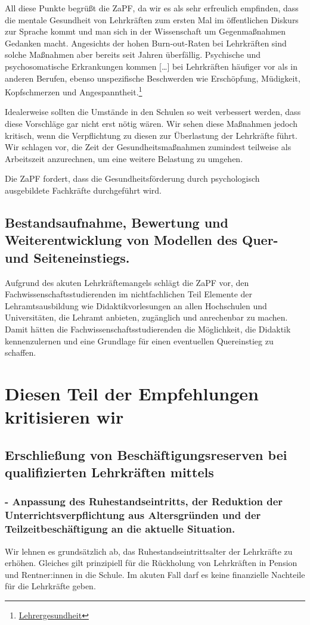 \documentclass[DIV=calc]{scrartcl}
\let\oldgrqq=\grqq
\def\grqq{\oldgrqq\xspace}
\begin{document}
All diese Punkte begrüßt die ZaPF, da wir es als sehr erfreulich empfinden, dass die mentale Gesundheit von Lehrkräften zum ersten Mal im öffentlichen Diskurs zur Sprache kommt und man sich in der Wissenschaft um Gegenmaßnahmen Gedanken macht.
Angesichts der hohen Burn-out-Raten bei Lehrkräften sind solche Maßnahmen aber bereits seit Jahren überfällig. \glqq Psychische und psychosomatische Erkrankungen kommen [\dots] bei Lehrkräften häufiger vor als in anderen Berufen, ebenso unspezifische Beschwerden wie Erschöpfung, Müdigkeit, Kopfschmerzen und Angespanntheit.\grqq \footnote{\href{https://www.aerzteblatt.de/archiv/170601/Lehrergesundheit}{Lehrergesundheit}}

Idealerweise sollten die Umstände in den Schulen so weit verbessert werden, dass diese Vorschläge gar nicht erst nötig wären.
Wir sehen diese Maßnahmen jedoch kritisch, wenn die Verpflichtung zu diesen zur Überlastung der Lehrkräfte führt.
Wir schlagen vor, die Zeit der Gesundheitsmaßnahmen zumindest teilweise als Arbeitszeit anzurechnen, um eine weitere Belastung zu umgehen.

Die ZaPF fordert, dass die Gesundheitsförderung durch psychologisch ausgebildete Fachkräfte durchgeführt wird.

\subsection*{Bestandsaufnahme, Bewertung und Weiterentwicklung von Modellen des Quer- und Seiteneinstiegs.}
Aufgrund des akuten Lehrkräftemangels schlägt die ZaPF vor, den Fachwissenschaftsstudierenden im nichtfachlichen Teil Elemente der Lehramtsausbildung wie Didaktikvorlesungen an allen Hochschulen und Universitäten, die Lehramt anbieten, zugänglich und anrechenbar zu machen.
Damit hätten die Fachwissenschaftsstudierenden die Möglichkeit, die Didaktik kennenzulernen und eine Grundlage für einen eventuellen Quereinstieg zu schaffen.

\section*{Diesen Teil der Empfehlungen kritisieren wir}
\subsection*{Erschließung von Beschäftigungsreserven bei qualifizierten Lehrkräften mittels}
\subsubsection*{- Anpassung des Ruhestandseintritts, der Reduktion der Unterrichtsverpflichtung aus Altersgründen und der Teilzeitbeschäftigung an die aktuelle Situation.}
Wir lehnen es grundsätzlich ab, das Ruhestandseintrittsalter der Lehrkräfte zu erhöhen.
Gleiches gilt prinzipiell für die Rückholung von Lehrkräften in Pension und Rentner:innen in die Schule. Im akuten Fall darf es keine finanzielle Nachteile für die Lehrkräfte geben. 
\end{document}
